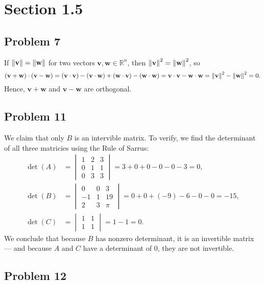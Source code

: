 \documentclass[11pt]{article}
\renewcommand{\vec}[1]{\mathbf{#1}}
\begin{document}

\section{Section 1.5}

\subsection*{Problem 7}

If $\norm{\vec{v}} = \norm{\vec{w}}$ for two vectors $\vec{v}, \vec{w} \in \mathbb{R}^{n}$, then $\norm{\vec{v}}^2 = \norm{\vec{w}}^{2}$, so 
\[
	(\vec{v} + \vec{w}) \cdot (\vec{v} - \vec{w}) = (\vec{v} \cdot \vec{v}) - (\vec{v} \cdot \vec{w}) + (\vec{w} \cdot \vec{v}) - (\vec{w} \cdot \vec{w}) = \vec{v} \cdot \vec{v} - \vec{w} \cdot \vec{w} = \norm{\vec{v}}^{2} - \norm{\vec{w}}^{2} = 0.
\]
Hence, $\vec{v} + \vec{w}$ and $\vec{v} - \vec{w}$ are orthogonal.

\subsection*{Problem 11}

We claim that only $B$ is an intervible matrix. To verify, we find the determinant of all three matricies using the Rule of Sarrus:
\begin{align*}
	\det (A) &= \begin{vmatrix}	1 & 2 & 3 \\ 0 & 1 & 1 \\ 0 & 3 & 3 \end{vmatrix} = 3 + 0 + 0 - 0 - 0 -3 = 0, \\
	\det (B) &= \begin{vmatrix} 0 & 0 & 3 \\ -1 & 1 & 19 \\ 2 & 3 & \pi \end{vmatrix} = 0 + 0 + (-9) - 6 - 0 - 0 = -15, \\
	\det (C) &= \begin{vmatrix} 1 & 1 \\ 1 & 1 \end{vmatrix} = 1 - 1 = 0.
\end{align*}
We conclude that because $B$ has nonzero determinant, it is an invertible matrix --- and because $A$ and $C$ have a determinant of $0$, they are not invertible.

\subsection*{Problem 12}
\end{document}

